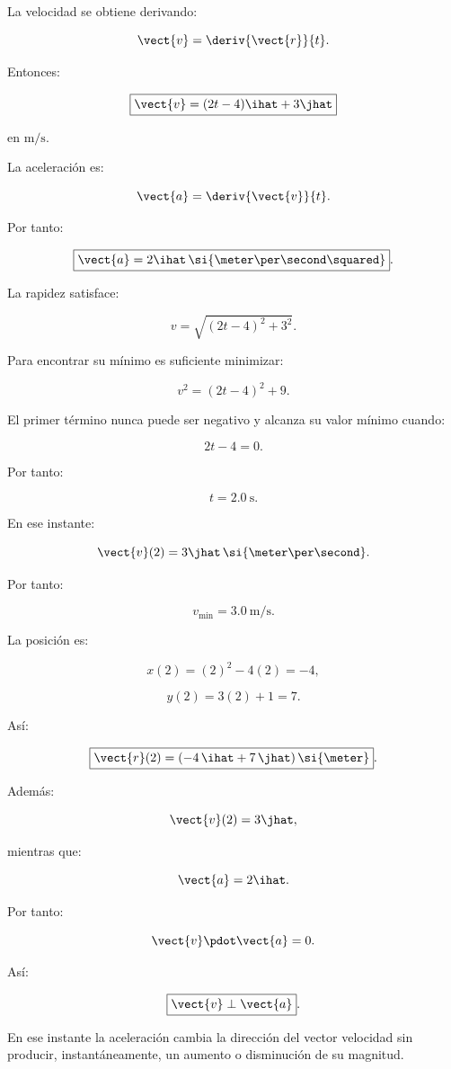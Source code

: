 \begin{explicacion}
La velocidad se obtiene derivando:

\[
\vect{v}
=
\deriv{\vect{r}}{t}.
\]

Entonces:

\[
\boxed{
\vect{v}
=
(2t-4)\ihat+3\jhat
}
\]

en \(\si{\meter\per\second}\).

La aceleración es:

\[
\vect{a}
=
\deriv{\vect{v}}{t}.
\]

Por tanto:

\[
\boxed{
\vect{a}
=
2\ihat\,
\si{\meter\per\second\squared}
}.
\]

La rapidez satisface:

\[
v
=
\sqrt{(2t-4)^2+3^2}.
\]

Para encontrar su mínimo es suficiente minimizar:

\[
v^2=(2t-4)^2+9.
\]

El primer término nunca puede ser negativo y alcanza su valor mínimo cuando:

\[
2t-4=0.
\]

Por tanto:

\[
\boxed{t=\SI{2.0}{\second}}.
\]

En ese instante:

\[
\vect{v}(2)
=
3\jhat\,
\si{\meter\per\second}.
\]

Por tanto:

\[
\boxed{v_{\min}=\SI{3.0}{\meter\per\second}}.
\]

La posición es:

\[
x(2)
=
(2)^2-4(2)
=
-4,
\]

\[
y(2)
=
3(2)+1
=
7.
\]

Así:

\[
\boxed{
\vect{r}(2)
=
(-4\,\ihat+7\,\jhat)\,\si{\meter}
}.
\]

Además:

\[
\vect{v}(2)
=
3\jhat,
\]

mientras que:

\[
\vect{a}=2\ihat.
\]

Por tanto:

\[
\vect{v}\pdot\vect{a}=0.
\]

Así:

\[
\boxed{\vect{v}\perp\vect{a}}.
\]

En ese instante la aceleración cambia la dirección del vector velocidad sin producir, instantáneamente, un aumento o disminución de su magnitud.
\end{explicacion}


